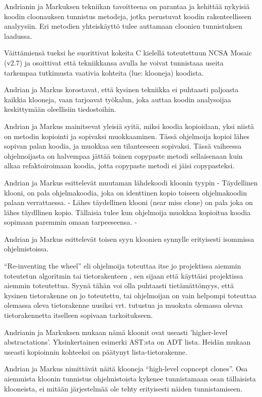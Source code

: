 \documentclass[finnish]{../tktltiki2}
\theoremstyle{definition}
\theoremstyle{remark}
\begin{document}
Andrianin ja Markuksen tekniikan tavoitteena on parantaa ja kehittää nykyisiä koodin cloonauksen tunnistus metodeja,
jotka perustuvat koodin rakenteelliseen analyysiin.
Eri metodien yhteiskäyttö tulee auttamaan cloonien tunnistuksen laadussa.


Väittämiensä tueksi he suorittivat kokeita C kielellä toteutettuun NCSA Mosaic (v2.7) ja osoittivat että tekniikkansa
avulla he voivat tunnistaaa useita tarkempaa
tutkimusta vaativia kohteita (lue: klooneja) koodista.

Andrian ja Markus korostavat, että kysinen tekniikka ei puhtaasti paljoasta kaikkia klooneja, vaan tarjoavat työkalun,
joka auttaa koodin analysoijaa keskittymään oleellisiin tiedostoihin.


Andrian ja Markus mainitsevat yleisiä syitä, miksi koodia kopioidaan, yksi niistä on metodin kopiointi ja sopivaksi
muokkaaminen. Tässä ohjelmoija kopioi lähes sopivan palan koodia, ja muokkaa sen tilanteeseen sopivaksi. Tässä
vaiheessa ohjelmoijasta on halvempaa jättää toinen copypaste metodi sellaisenaan kuin alkaa refaktoiroimaan koodia,
jotta copypaste metodi ei jäisi copypasteksi.


Andrian ja Markus esittelevät muutaman lähdekoodi kloonin tyypin
- Täydellinen klooni, on pala ohjelmakoodia, joka on identtinen kopio toiseen ohjelmakoodin palaan verrattaessa.
- Lähes täydellinen klooni (near miss clone) on pala joka on lähes täydllinen kopio. Tällaisia tulee kun ohjelmoija
muokkaa kopioitua koodia sopimaan paremmin omaan tarpeeseensa.
-


Andrian ja Markus esittelevät toisen syyn kloonien synnylle erityisesti isommissa ohjelmistoissa.

``Re-inventing the wheel'' eli ohjelmoija toteuttaa itse jo projektissa aiemmin toteutetun algoritmin tai tietorakenteen
, sen sijaan että käyttäisi projektissa aiemmin toteutettua. Syynä tähän voi olla puhtaasti tietämättömyys, että kysinen
tietorakenne on jo toteutettu, tai ohjelmoijan on vain helpompi toteuttaa olemassa oleva tietorakenne uusiksi vrt.
tutustua ja muokata olemassa olevaa tietorakennetta itselleen sopivaan tarkoitukseen.


Andrianin ja Markuksen mukaan nämä kloonit ovat useasti 'higher-level abstractations'. Yksinkertainen esimerki AST:sta
on ADT lista. Heidän mukaan useasti kopioinnin kohteeksi on päätynyt lista-tietorakenne.

Andrian ja Markus nimittävät näitä klooneja ``high-level copncept clones''.
Osa aiemmista kloonin tunnistus ohjelmistoista kykenee tunnistamaan osan tällaisista klooneista, ei mitään järjestelmää
ole tehty erityisesti näiden tunnistamiseen.
\end{document}
